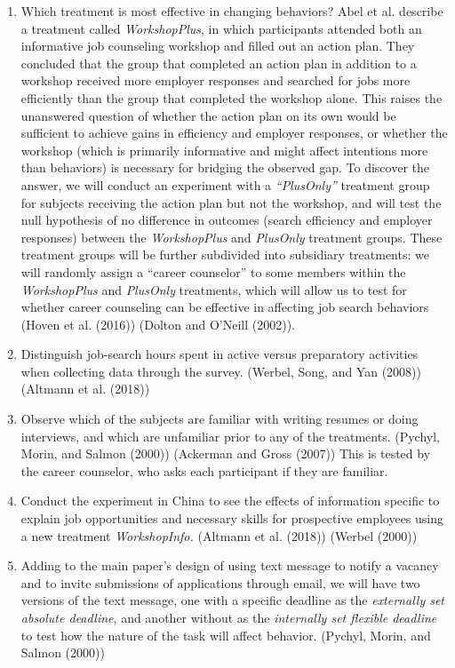 \documentclass[]{elsarticle} %
\begin{document}
\begin{enumerate}
\def\labelenumi{\arabic{enumi}.}
\item
  Which treatment is most effective in changing behaviors? Abel et al.
  describe a treatment called \emph{WorkshopPlus}, in which participants
  attended both an informative job counseling workshop and filled out an
  action plan. They concluded that the group that completed an action
  plan in addition to a workshop received more employer responses and
  searched for jobs more efficiently than the group that completed the
  workshop alone. This raises the unanswered question of whether the
  action plan on its own would be sufficient to achieve gains in
  efficiency and employer responses, or whether the workshop (which is
  primarily informative and might affect intentions more than behaviors)
  is necessary for bridging the observed gap. To discover the answer, we
  will conduct an experiment with a \emph{``PlusOnly''} treatment group
  for subjects receiving the action plan but not the workshop, and will
  test the null hypothesis of no difference in outcomes (search
  efficiency and employer responses) between the \emph{WorkshopPlus} and
  \emph{PlusOnly} treatment groups. These treatment groups will be
  further subdivided into subsidiary treatments: we will randomly assign
  a ``career counselor'' to some members within the \emph{WorkshopPlus}
  and \emph{PlusOnly} treatments, which will allow us to test for
  whether career counseling can be effective in affecting job search
  behaviors (Hoven et al. (2016)) (Dolton and O'Neill (2002)).
\item
  Distinguish job-search hours spent in active versus preparatory
  activities when collecting data through the survey. (Werbel, Song, and
  Yan (2008)) (Altmann et al. (2018))
\item
  Observe which of the subjects are familiar with writing resumes or
  doing interviews, and which are unfamiliar prior to any of the
  treatments. (Pychyl, Morin, and Salmon (2000)) (Ackerman and Gross
  (2007)) This is tested by the career counselor, who asks each
  participant if they are familiar.
\item
  Conduct the experiment in China to see the effects of information
  specific to explain job opportunities and necessary skills for
  prospective employees using a new treatment \emph{WorkshopInfo.}
  (Altmann et al. (2018)) (Werbel (2000))
\item
  Adding to the main paper's design of using text message to notify a
  vacancy and to invite submissions of applications through email, we
  will have two versions of the text message, one with a specific
  deadline as the \emph{externally set absolute deadline}, and another
  without as the \emph{internally set flexible deadline} to test how the
  nature of the task will affect behavior. (Pychyl, Morin, and Salmon
  (2000))
\end{enumerate}
\end{document}
